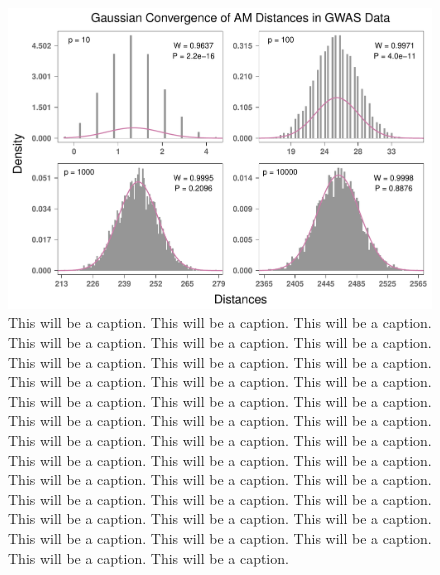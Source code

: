 \documentclass[10pt,letterpaper]{article}\usepackage[]{graphicx}\usepackage[]{color}
\begin{document}
\begin{figure}[H]
	\includegraphics[width=\textwidth]{central_limit_hist_gwas_AM.pdf}
	\caption{This will be a caption. This will be a caption. This will be a caption. This will be a caption. This will be a caption. This will be a caption. This will be a caption. This will be a caption. This will be a caption. This will be a caption. This will be a caption. This will be a caption. This will be a caption. This will be a caption. This will be a caption. This will be a caption. This will be a caption. This will be a caption. This will be a caption. This will be a caption. This will be a caption. This will be a caption. This will be a caption. This will be a caption. This will be a caption. This will be a caption. This will be a caption. This will be a caption. This will be a caption. This will be a caption. This will be a caption. This will be a caption. This will be a caption. This will be a caption. This will be a caption. This will be a caption. This will be a caption. This will be a caption.}
\end{figure}
\end{document}

